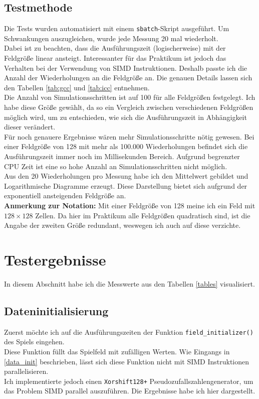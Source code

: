 \documentclass[german,plainarticle,hyperref,utf8]{zihpub}
\begin{document}
	\subsection{Testmethode}
	Die Tests wurden automatisiert mit einem \texttt{sbatch}-Skript ausgeführt. Um Schwankungen auszugleichen, wurde jede Messung 20 mal wiederholt.\\
	Dabei ist zu beachten, dass die Ausführungszeit (logischerweise) mit der Feldgröße linear ansteigt. Interessanter für das Praktikum ist jedoch das Verhalten bei der Verwendung von SIMD Instruktionen. Deshalb passte ich die Anzahl der Wiederholungen an die Feldgröße an. Die genauen Details lassen sich den Tabellen \ref{tab:gcc} und
	\ref{tab:icc} entnehmen.\\
	Die Anzahl von Simulationsschritten ist auf 100 für alle Feldgrößen festgelegt. Ich habe diese Größe gewählt, da so ein Vergleich zwischen verschiedenen Feldgrößen möglich wird, um zu entschieden, wie sich die Ausführungszeit in Abhängigkeit dieser verändert.\\
	Für noch genauere Ergebnisse wären mehr Simulationsschritte nötig gewesen. Bei einer Feldgröße von 128 mit mehr als 100.000 Wiederholungen befindet sich die Ausführungszeit immer noch im Millisekunden Bereich. Aufgrund begrenzter CPU Zeit ist eine so hohe Anzahl an Simulationsschritten nicht möglich.\\
	
	Aus den 20 Wiederholungen pro Messung habe ich den Mittelwert gebildet und Logarithmische Diagramme erzeugt. Diese Darstellung bietet sich aufgrund der exponentiell ansteigenden Feldgröße an.\\
	
	\textbf{Anmerkung zur Notation:}
	Mit einer Feldgröße von 128 meine ich ein Feld mit $128\times 128$ Zellen. Da hier im Praktikum alle Feldgrößen quadratisch sind, ist die Angabe der zweiten Größe redundant, weswegen ich auch auf diese verzichte.
	\newpage
	\section{Testergebnisse} \label{erg}
	In diesem Abschnitt habe ich die Messwerte aus den Tabellen \ref{tables} visualisiert.
	\subsection{Dateninitialisierung}
	Zuerst möchte ich auf die Ausführungszeiten der Funktion \texttt{field\_initializer()} des Spiels eingehen.\\
	Diese Funktion füllt das Spielfeld mit zufälligen Werten. Wie Eingangs in \ref{data_init} beschrieben, lässt sich diese Funktion nicht mit SIMD Instruktionen parallelisieren.\\
	Ich implementierte jedoch einen \texttt{Xorshift128+} Pseudozufallszahlengenerator, um das Problem SIMD parallel auszuführen.
	Die Ergebnisse habe ich hier dargestellt.
	
\end{document}
